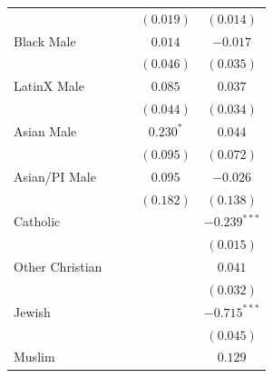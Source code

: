 \documentclass[
  12pt,
  letterpaper,
]{article}
\begin{document}
\begin{table}
\begin{center}
\begin{tabular}{l c c c c}
                                                     &                &                & $(0.019)$      & $(0.014)$      \\
Black Male                                           &                &                & $0.014$        & $-0.017$       \\
                                                     &                &                & $(0.046)$      & $(0.035)$      \\
LatinX Male                                          &                &                & $0.085$        & $0.037$        \\
                                                     &                &                & $(0.044)$      & $(0.034)$      \\
Asian Male                                           &                &                & $0.230^{*}$    & $0.044$        \\
                                                     &                &                & $(0.095)$      & $(0.072)$      \\
Asian/PI Male                                        &                &                & $0.095$        & $-0.026$       \\
                                                     &                &                & $(0.182)$      & $(0.138)$      \\
Catholic                                             &                &                &                & $-0.239^{***}$ \\
                                                     &                &                &                & $(0.015)$      \\
Other Christian                                      &                &                &                & $0.041$        \\
                                                     &                &                &                & $(0.032)$      \\
Jewish                                               &                &                &                & $-0.715^{***}$ \\
                                                     &                &                &                & $(0.045)$      \\
Muslim                                               &                &                &                & $0.129$        \\

\end{tabular}
\end{center}
\end{table}
\end{document}
